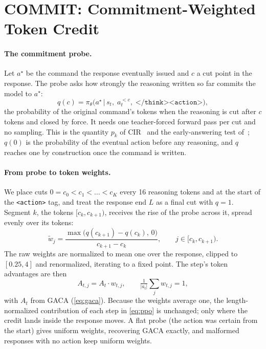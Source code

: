 \section{COMMIT: Commitment-Weighted Token Credit}
\label{sec:method}

\paragraph{The commitment probe.}
Let $a^\star$ be the command the response eventually issued and $c$ a cut point in the response. The
probe asks how strongly the reasoning written so far commits the model to $a^\star$:
\begin{equation}
q(c) = \pi_\theta\big(a^\star \,\big|\, s_t,\; a_t^{<c},\; \texttt{</think><action>}\big),
\label{eq:probe}
\end{equation}
the probability of the original command's tokens when the reasoning is cut after $c$ tokens and
closed by force. It needs one teacher-forced forward pass per cut and no sampling. This is the
quantity $p_k$ of CIR~\cite{yu2026cir} and the early-answering test of~\cite{lanham2023faithfulness};
$q(0)$ is the probability of the eventual action before any reasoning, and $q$ reaches one by
construction once the command is written.

\paragraph{From probe to token weights.}
We place cuts $0 = c_0 < c_1 < \dots < c_K$ every 16 reasoning tokens and at the start of the
\texttt{<action>} tag, and treat the response end $L$ as a final cut with $q = 1$. Segment $k$, the
tokens $[c_k, c_{k+1})$, receives the rise of the probe across it, spread evenly over its tokens:
\begin{equation}
\tilde w_j = \frac{\max\big(q(c_{k+1}) - q(c_k),\, 0\big)}{c_{k+1} - c_k}, \qquad j \in [c_k, c_{k+1}).
\label{eq:raw}
\end{equation}
The raw weights are normalized to mean one over the response, clipped to $[0.25, 4]$ and renormalized,
iterating to a fixed point. The step's token advantages are then
\begin{equation}
A_{t,j} = A_t \cdot w_{t,j}, \qquad \tfrac{1}{|a_t|}\textstyle\sum_j w_{t,j} = 1,
\label{eq:ours}
\end{equation}
with $A_t$ from GACA (\cref{eq:gaca}). Because the weights average one, the length-normalized
contribution of each step in \cref{eq:ppo} is unchanged; only where the credit lands inside the response
moves. A flat probe (the action was certain from the start) gives uniform weights, recovering GACA
exactly, and malformed responses with no action keep uniform weights.

